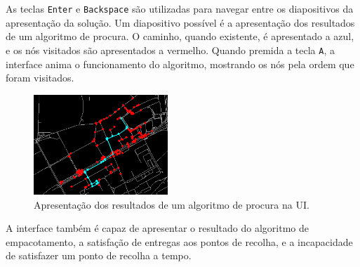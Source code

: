 \documentclass[12pt, a4paper]{article}
\begin{document}
As teclas \texttt{Enter} e \texttt{Backspace} são utilizadas para navegar entre os diapositivos da
apresentação da solução. Um diapositivo possível é a apresentação dos resultados de um algoritmo de
procura. O caminho, quando existente, é apresentado a azul, e os nós visitados são apresentados a
vermelho. Quando premida a tecla \texttt{A}, a interface anima o funcionamento do algoritmo,
mostrando os nós pela ordem que foram visitados.

\begin{figure}[H]
    \centering
    \includegraphics[width=0.45\textwidth]{res/Procura.png}
    \caption{Apresentação dos resultados de um algoritmo de procura na UI.}
\end{figure}

A interface também é capaz de apresentar o resultado do algoritmo de empacotamento, a satisfação de
entregas aos pontos de recolha, e a incapacidade de satisfazer um ponto de recolha a tempo.
\end{document}
